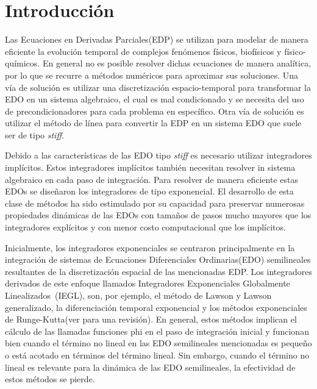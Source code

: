 \chapter*{Introducción}\label{chapter:introduction}

Las Ecuaciones en Derivadas Parciales(EDP) se utilizan para modelar de manera eficiente la evolución temporal de complejos fenómenos físicos, biofísicos y físico-químicos. En general no es posible resolver dichas ecuaciones de manera analítica, por lo que se recurre a métodos numéricos para aproximar sus soluciones. Una vía de solución es utilizar una discretización espacio-temporal para transformar la EDO en un sistema algebraico, el cual es mal condicionado y se necesita del uso de precondicionadores para cada problema en específico. Otra vía de solución es utilizar el método de línea para convertir la EDP en un sistema EDO que suele ser de tipo \emph{stiff}.

Debido a las características de las EDO tipo \emph{stiff} es necesario utilizar integradores implícitos. Estos integradores implícitos también necesitan resolver in sistema algebraico en cada paso de integración. Para resolver de manera eficiente estas EDOs se diseñaron los integradores de tipo exponencial. El desarrollo de esta clase de métodos ha sido estimulado por su capacidad para preservar numerosas propiedades dinámicas de las EDOs con tamaños de pasos mucho mayores que los integradores explícitos y con menor costo computacional que los implícitos.

Inicialmente, los integradores exponenciales se centraron principalmente en la integración de sistemas de Ecuaciones Diferenciales Ordinarias(EDO) semilineales resultantes de la discretización espacial de las mencionadas EDP. Los integradores derivados de este enfoque llamados Integradores Exponenciales Globalmente Linealizados~(IEGL), son, por ejemplo, el método de Lawson y Lawson generalizado, la diferenciación temporal exponencial y los métodos exponenciales de Runge-Kutta(ver \cite{Berland07} para una revisión). En general, estos métodos implican el cálculo de las llamadas funciones phi en el paso de integración inicial y funcionan bien cuando el término no lineal en las EDO semilineales mencionadas es pequeño o está acotado en términos del término lineal. Sin embargo, cuando el término no lineal es relevante para la dinámica de las EDO semilineales, la efectividad de estos métodos se pierde.

